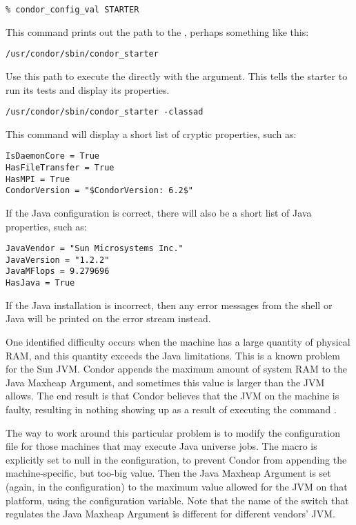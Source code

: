 \begin{verbatim}
% condor_config_val STARTER
\end{verbatim}

This command prints out the path to the ,
perhaps something like this:

\begin{verbatim}
/usr/condor/sbin/condor_starter
\end{verbatim}

Use this path to execute the  directly
with the  argument.
This tells the starter to run its tests and display its properties.

\begin{verbatim}
/usr/condor/sbin/condor_starter -classad
\end{verbatim}

This command will display a short list of cryptic properties, such as:

\begin{verbatim}
IsDaemonCore = True
HasFileTransfer = True
HasMPI = True
CondorVersion = "$CondorVersion: 6.2$"
\end{verbatim}

If the Java configuration is correct, there will also
be a short list of Java properties, such as:

\begin{verbatim}
JavaVendor = "Sun Microsystems Inc."
JavaVersion = "1.2.2"
JavaMFlops = 9.279696
HasJava = True
\end{verbatim}

If the Java installation is incorrect, then any error
messages from the shell or Java will be printed
on the error stream instead.

One identified difficulty occurs when the machine has
a large quantity of physical RAM, and this quantity
exceeds the Java limitations.
This is a known problem for the Sun JVM.
Condor appends the maximum amount of system RAM
to the Java Maxheap Argument,
and sometimes this value is larger than the JVM allows.
The end result is that Condor believes that the JVM on the machine
is faulty,
resulting in nothing showing up as a result of executing
the command .

The way to work around this particular problem is to modify
the configuration file for those machines that may execute
Java universe jobs.
The  macro is explicitly set
to null in the configuration, to prevent Condor from appending
the machine-specific, but too-big value.
Then the Java Maxheap Argument is set (again, in the configuration)
to the maximum value allowed for the JVM on that platform,
using the  configuration variable.
Note that the name of the switch that regulates the Java
Maxheap Argument is different for different vendors' JVM.


